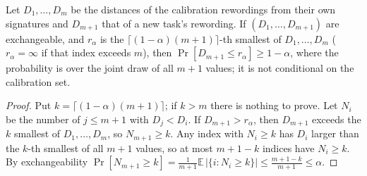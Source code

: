 \begin{table}[t]
  \caption{Sibling tasks that collide, selected by hand from these lists. (3): the unedited instruction of the arriving task lies inside the
  zone of the older task under the encoder zone (first 15 collisions of the file). (4): a French
  paraphrase of the first task is certified for the second (older or, when its own zone does not hold it, newer) under the judge zone (first 12 such
  cases of the file); the score is the judge's score for that paraphrase against the instruction
  of the claiming task. ``--'': not among the cases listed in the file.}
  \label{tab:widensiblings}
  \centering
  \footnotesize
  \setlength{\tabcolsep}{3pt}
  
\end{table}

\begin{proposition}
\label{prop:conformal}
Let $D_1, \dots, D_m$ be the distances of the calibration rewordings from their own signatures and
$D_{m+1}$ that of a new task's rewording. If $(D_1, \dots, D_{m+1})$ are exchangeable, and $r_\alpha$ is the
$\lceil (1-\alpha)(m+1) \rceil$-th smallest of $D_1, \dots, D_m$ ($r_\alpha = \infty$ if that index exceeds $m$), then
$\Pr[D_{m+1} \le r_\alpha] \ge 1 - \alpha$, where the probability is over the joint draw of all $m+1$ values; it is not conditional on the calibration set.
\end{proposition}

\begin{proof}
Put $k=\lceil(1-\alpha)(m+1)\rceil$; if $k>m$ there is nothing to prove. Let $N_i$ be the number of $j\le m+1$ with $D_j<D_i$. If $D_{m+1}>r_\alpha$, then
$D_{m+1}$ exceeds the $k$ smallest of $D_1,\dots,D_m$, so $N_{m+1}\ge k$. Any index with $N_i\ge k$ has $D_i$ larger than the $k$-th smallest of all $m+1$ values,
so at most $m+1-k$ indices have $N_i\ge k$. By exchangeability $\Pr[N_{m+1}\ge k]=\frac{1}{m+1}\mathbb{E}\,|\{i: N_i\ge k\}|\le\frac{m+1-k}{m+1}\le\alpha$.
\end{proof}

